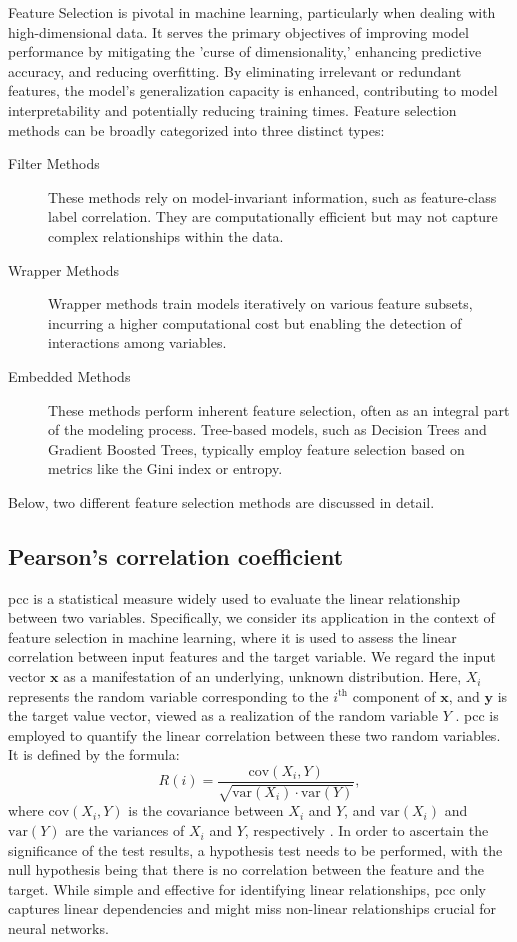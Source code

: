 \documentclass[12pt, a4paper, headinclude, twoside, plainheadsepline, open=right, numbers=noenddot, hidelinks, toc=listof, toc=bibliography]{scrreprt}
\begin{document}
Feature Selection is pivotal in machine learning, particularly when dealing with high-dimensional data. It serves the primary objectives of improving model performance by mitigating the 'curse of dimensionality,' enhancing predictive accuracy, and reducing overfitting. By eliminating irrelevant or redundant features, the model's generalization capacity is enhanced, contributing to model interpretability and potentially reducing training times.
Feature selection methods can be broadly categorized into three distinct types:
\begin{description}
\item[Filter Methods] These methods rely on model-invariant information, such as feature-class label correlation. They are computationally efficient but may not capture complex relationships within the data.
\item[Wrapper Methods] Wrapper methods train models iteratively on various feature subsets, incurring a higher computational cost but enabling the detection of interactions among variables.
\item[Embedded Methods] These methods perform inherent feature selection, often as an integral part of the modeling process. Tree-based models, such as Decision Trees and Gradient Boosted Trees, typically employ feature selection based on metrics like the Gini index or entropy.
\end{description}
Below, two different feature selection methods are discussed in detail.

\subsection{Pearson's correlation coefficient}
\label{ssec:pearsons}
\Ac{pcc} is a statistical measure widely used to evaluate the linear relationship between two variables. 
Specifically, we consider its application in the context of feature selection in machine learning, where it is used to assess the linear correlation between input features and the target variable. 
We regard the input vector $\mathbf{x}$ as a manifestation of an underlying, unknown distribution. 
Here, $X_i$ represents the random variable corresponding to the $i^{\text{th}}$ component of $\mathbf{x}$, and $\mathbf{y}$ is the target value vector, viewed as a realization of the random variable $Y$ \cite{guyonIntroductionVariableFeature}. 
\Ac{pcc} is employed to quantify the linear correlation between these two random variables. It is defined by the formula:
\begin{equation}
R(i) = \frac{\text{cov}(X_i, Y)}{\sqrt{\text{var}(X_i) \cdot \text{var}(Y)}},
\end{equation}
where $\text{cov}(X_i, Y)$ is the covariance between $X_i$ and $Y$, and $\text{var}(X_i)$ and $\text{var}(Y)$ are the variances of $X_i$ and $Y$, respectively \cite{chandrashekarSurveyFeatureSelection2014}.
In order to ascertain the significance of the test results, a hypothesis test needs to be performed, with the null hypothesis being that there is no correlation between the feature and the target.
While simple and effective for identifying linear relationships, \ac{pcc} only captures linear dependencies and might miss non-linear relationships crucial for neural networks.
\end{document}
